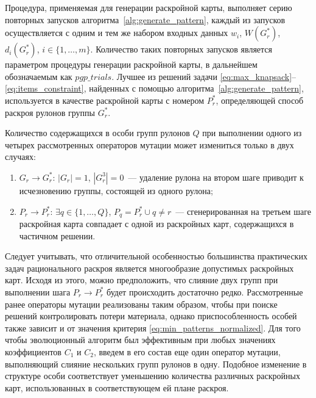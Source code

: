 \documentclass[12pt]{article}
\begin{document}
Процедура, применяемая для генерации раскройной карты, выполняет серию 
повторных запусков алгоритма~\ref{alg:generate_pattern}, 
каждый из запусков осуществляется с одним и тем же набором входных 
данных $w_i$, $W(G_r^*)$, $d_i(G_r^*)$, $i \in \{1,\ldots,m\}$. Количество 
таких повторных запусков является параметром процедуры генерации раскройной 
карты, в дальнейшем обозначаемым как $pgp\_trials$. Лучшее из решений задачи 
\eqref{eq:max_knapsack}--\eqref{eq:items_constraint}, 
найденных с помощью алгоритма~\ref{alg:generate_pattern}, 
используется в качестве раскройной карты с номером $P_r^*$, определяющей 
способ раскроя рулонов группы $G_r^*$.

Количество содержащихся в особи групп рулонов $Q$ при выполнении одного из 
четырех рассмотренных операторов мутации может измениться только в двух 
случаях:
\begin{enumerate}
    \item $G_r \rightarrow G_r^*$: $|G_r|=1$, $|G_r^3|=0$~--- удаление рулона 
    на втором шаге приводит к исчезновению группы, состоящей из одного рулона;
    \item $P_r \rightarrow P_r^*$: $\exists q \in \{1,\ldots,Q\}$, 
        $P_q=P_r^* \cup q \neq r$~--- 
    сгенерированная на третьем шаге раскройная карта совпадает с одной из 
    раскройных карт, содержащихся в частичном решении.
\end{enumerate}

Следует учитывать, что отличительной особенностью большинства практических 
задач рационального раскроя является многообразие допустимых раскройных карт. 
Исходя из этого, можно предположить, что слияние двух групп при выполнении 
шага $P_r \rightarrow P_r^*$ будет происходить достаточно редко. Рассмотренные 
ранее операторы мутации реализованы таким образом, чтобы при поиске решений 
контролировать потери материала, однако приспособленность особей также зависит 
и от значения критерия 
\eqref{eq:min_patterns_normalized}. 
Для того чтобы эволюционный алгоритм был 
эффективным при любых значениях коэффициентов $C_1$ и $C_2$, введем в его 
состав еще один оператор мутации, выполняющий слияние нескольких групп рулонов 
в одну. Подобное изменение в структуре особи соответствует уменьшению 
количества различных раскройных карт, использованных в соответствующем ей 
плане раскроя.
\end{document}
